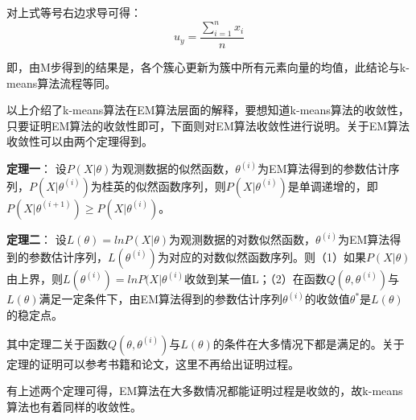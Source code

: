 对上式等号右边求导可得：
$$u_y=\frac{\sum_{i=1}^n{x_i}}{n}$$

即，由M步得到的结果是，各个簇心更新为簇中所有元素向量的均值，此结论与k-means算法流程等同。

以上介绍了k-means算法在EM算法层面的解释，要想知道k-means算法的收敛性，只要证明EM算法的收敛性即可，下面则对EM算法收敛性进行说明。关于EM算法收敛性可以由两个定理得到。

\textbf{定理一}： 设$P(X|\theta)$为观测数据的似然函数，$\theta^{(i)}$为EM算法得到的参数估计序列，$P(X|\theta^{(i)})$为桂英的似然函数序列，则$P(X|\theta^{(i)})$是单调递增的，即$P\left( X|\theta ^{\left( i+1 \right)} \right) \geqslant P\left( X|\theta ^{\left( i \right)} \right) $。

\textbf{定理二}： 设$L(\theta)=lnP(X|\theta)$为观测数据的对数似然函数，$\theta^{(i)}$为EM算法得到的参数估计序列，$L(\theta^{(i)})$为对应的对数似然函数序列。则（1）如果$P(X|\theta)$由上界，则$L(\theta^{(i)})=lnP(X|\theta^{(i)}$收敛到某一值L；（2）在函数$Q(\theta,\theta^{(i)})$与$L(\theta)$满足一定条件下，由EM算法得到的参数估计序列$\theta^{(i)}$的收敛值$\theta^{*}$是$L(\theta)$的稳定点。

其中定理二关于函数$Q(\theta,\theta^{(i)})$与$L(\theta)$的条件在大多情况下都是满足的。关于定理的证明可以参考书籍\cite{李航2012统计学习方法}和论文\cite{neal1998view}，这里不再给出证明过程。

有上述两个定理可得，EM算法在大多数情况都能证明过程是收敛的，故k-means算法也有着同样的收敛性。